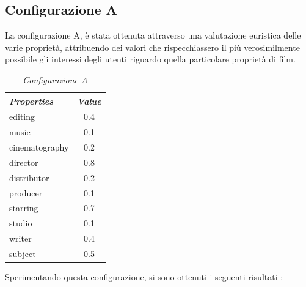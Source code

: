 \subsection{Configurazione A}
La configurazione A, è stata ottenuta attraverso una valutazione euristica delle varie proprietà, attribuendo dei valori che rispecchiassero il più verosimilmente possibile gli interessi degli utenti riguardo quella particolare proprietà di film.
\begin{table}[H]
\small
\centering
\begin{tabular}{l c}
\textit{Properties} & \textit{Value} \\\hline
editing & 0.4 \\
music & 0.1 \\
cinematography & 0.2 \\
director & 0.8 \\
distributor & 0.2 \\
producer & 0.1 \\
starring & 0.7 \\
studio & 0.1 \\
writer & 0.4 \\
subject & 0.5 \\
\end{tabular}
\caption{\emph{Configurazione A}}
\end{table}
Sperimentando questa configurazione, si sono ottenuti i seguenti risultati : 


\setlength{\tabcolsep}{12pt}

